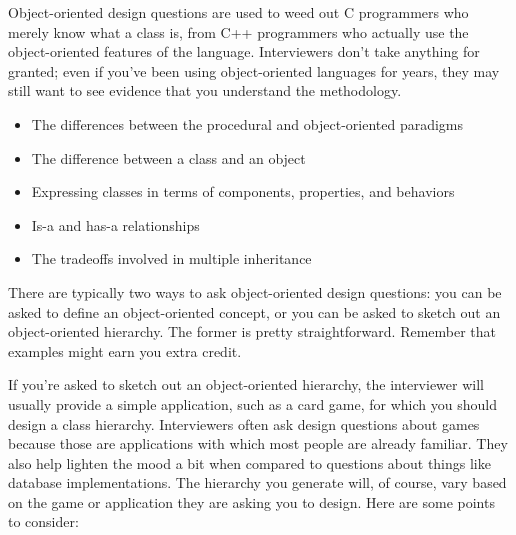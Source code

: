 
Object-oriented design questions are used to weed out C programmers who merely know what a class is, from C++ programmers who actually use the object-oriented features of the language. Interviewers don’t take anything for granted; even if you’ve been using object-oriented languages for years, they may still want to see evidence that you understand the methodology.


\begin{itemize}
\item
The differences between the procedural and object-oriented paradigms

\item
The difference between a class and an object

\item
Expressing classes in terms of components, properties, and behaviors

\item
Is-a and has-a relationships

\item
The tradeoffs involved in multiple inheritance
\end{itemize}


There are typically two ways to ask object-oriented design questions: you can be asked to define an object-oriented concept, or you can be asked to sketch out an object-oriented hierarchy. The former is pretty straightforward. Remember that examples might earn you extra credit.

If you’re asked to sketch out an object-oriented hierarchy, the interviewer will usually provide a simple application, such as a card game, for which you should design a class hierarchy. Interviewers often ask design questions about games because those are applications with which most people are already familiar. They also help lighten the mood a bit when compared to questions about things like database implementations. The hierarchy you generate will, of course, vary based on the game or application they are asking you to design. Here are some points to consider:

